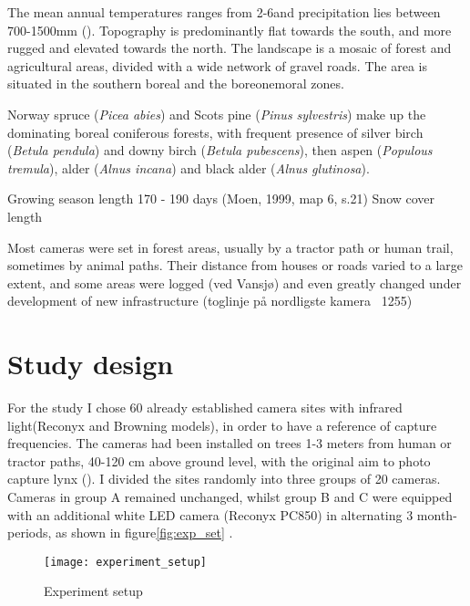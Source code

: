The mean annual temperatures ranges from 2-6\celsius  and precipitation lies between 700-1500mm (\cite{Moen1999}). 
Topography is predominantly flat towards the south, and more rugged and elevated towards the north. The landscape is a mosaic of forest and agricultural areas, divided with a wide network of gravel roads.
The area is situated in the southern boreal and the boreonemoral zones. %

Norway spruce (\textit{Picea abies}) and Scots pine (\textit{Pinus sylvestris}) make up the dominating boreal coniferous forests, with frequent presence of silver birch (\textit{Betula pendula}) and downy birch (\textit{Betula pubescens}), then aspen (\textit{Populous tremula}), alder (\textit{Alnus incana}) and black alder (\textit{Alnus glutinosa}).

Growing season length 170 - 190 days (Moen, 1999, map 6, s.21) %
Snow cover length												%

Most cameras were set in forest areas, usually by a tractor path or human trail, sometimes by animal paths. Their distance from houses or roads varied to a large extent, and some areas were logged (ved Vansjø) and even greatly changed under development of new infrastructure (toglinje på nordligste kamera ~1255)


\section{Study design} %
For the study I chose 60 already established camera sites with infrared light(Reconyx and Browning models), in order to have a reference of capture frequencies. The cameras had been installed on trees 1-3 meters from human or tractor paths, 40-120 cm above ground level, with the original aim to photo capture lynx (\cite{Odden2015}). 
I divided the sites randomly into three groups of 20 cameras. Cameras in group A remained unchanged, whilst group B and C were equipped with an additional white LED camera (Reconyx PC850) in alternating 3 month-periods, as shown in figure\vref{fig:exp_set} .
\begin{figure}
    \begin{center}
    	\texttt{[image: experiment\_setup]} %
    \end{center}
    	\caption{Experiment setup}
    \label{fig:exp_set}
\end{figure}


